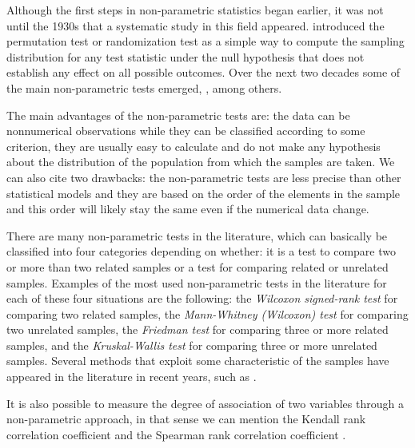 Although the first steps in non-parametric statistics began earlier, it was not until the 1930s that a systematic study in this field appeared. \cite{Fisher1935} introduced the permutation test or randomization test as a simple way to compute the sampling distribution for any test statistic under the null hypothesis that does not establish any effect on all possible outcomes. Over the next two decades some of the main non-parametric tests emerged, \cite{Friedman1940,Kendall1939,Kendall1938,Kruskal1958,Kruskal1952,Wilcoxon1947,Pitman1937,Wilcoxon1945}, among others.

The main advantages of the non-parametric tests are: the data can be nonnumerical observations while they can be classified according to some criterion, they are usually  easy to calculate and do not make any hypothesis about the distribution of the population from which the samples are taken. We can also cite two drawbacks: the non-parametric tests are less precise than other statistical models and they are based on the order of the elements in the sample and this order will likely stay the same even if the numerical data change. 

There are many non-parametric tests in the literature, which can basically be classified into four categories depending on whether: it is a test to compare two or more than two related samples or a test for comparing related or unrelated samples. Examples of the most used non-parametric tests in the literature for each of these four situations are the following: the \emph{Wilcoxon signed-rank test} \citep{Wilcoxon1945} for comparing two related samples, the \emph{Mann-Whitney (Wilcoxon) test} \citep{Wilcoxon1947} for comparing two unrelated samples, the  \emph{Friedman test} \citep{Friedman1940} for comparing three or more related samples, and the \emph{Kruskal-Wallis test} \citep{Kruskal1952} for comparing three or more unrelated samples. Several methods that exploit some characteristic of the samples have appeared in the literature in recent years, such as \cite{Alhakim2008, Terpstra2003}. 

It is also possible to measure the degree of association of two variables through a non-parametric approach, in that sense we can mention the Kendall rank correlation coefficient \citep{Kendall1938} and the Spearman rank correlation coefficient \citep{Spearman1904}.

